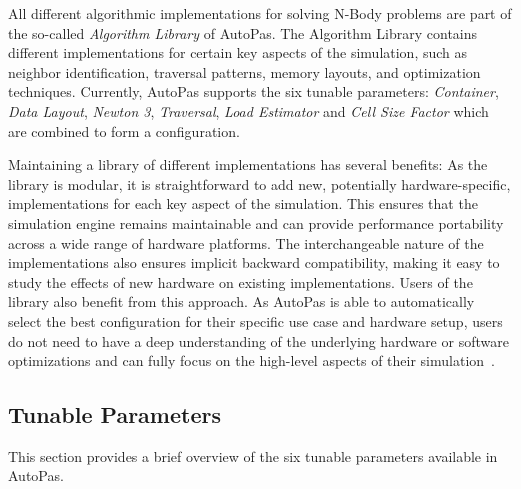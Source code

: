 \documentclass[conference]{IEEEtran}
\begin{document}
All different algorithmic implementations for solving N-Body problems are part of the so-called \textit{Algorithm Library} of AutoPas. The Algorithm Library contains different implementations for certain key aspects of the simulation, such as neighbor identification, traversal patterns, memory layouts, and optimization techniques. Currently, AutoPas supports the six tunable parameters: \textit{Container}, \textit{Data Layout}, \textit{Newton 3}, \textit{Traversal}, \textit{Load Estimator} and \textit{Cell Size Factor} which are combined to form a configuration.

Maintaining a library of different implementations has several benefits: As the library is modular, it is straightforward to add new, potentially hardware-specific, implementations for each key aspect of the simulation. This ensures that the simulation engine remains maintainable and can provide performance portability across a wide range of hardware platforms. The interchangeable nature of the implementations also ensures implicit backward compatibility, making it easy to study the effects of new hardware on existing implementations. Users of the library also benefit from this approach. As AutoPas is able to automatically select the best configuration for their specific use case and hardware setup, users do not need to have a deep understanding of the underlying hardware or software optimizations and can fully focus on the high-level aspects of their simulation~\cite{Tchipev2020}\cite{Gratl2022AutoPas}.

\subsection{Tunable Parameters}

This section provides a brief overview of the six tunable parameters available in AutoPas.
\end{document}
